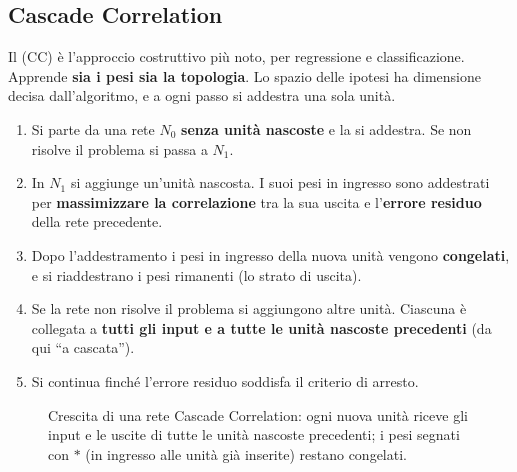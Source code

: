\subsection{Cascade Correlation}

Il  (CC) è l'approccio costruttivo più noto, per regressione e classificazione.
Apprende \textbf{sia i pesi sia la topologia}. Lo spazio delle ipotesi ha dimensione decisa dall'algoritmo, e a
ogni passo si addestra una sola unità.

\begin{algoritmo}
\begin{enumerate}
  \item Si parte da una rete $N_0$ \textbf{senza unità nascoste} e la si addestra. Se non risolve il problema si
        passa a $N_1$.
  \item In $N_1$ si aggiunge un'unità nascosta. I suoi pesi in ingresso sono addestrati per \textbf{massimizzare
        la correlazione} tra la sua uscita e l'\textbf{errore residuo} della rete precedente.
  \item Dopo l'addestramento i pesi in ingresso della nuova unità vengono \textbf{congelati}, e si riaddestrano i
        pesi rimanenti (lo strato di uscita).
  \item Se la rete non risolve il problema si aggiungono altre unità. Ciascuna è collegata a \textbf{tutti gli
        input e a tutte le unità nascoste precedenti} (da qui ``a cascata'').
  \item Si continua finché l'errore residuo soddisfa il criterio di arresto.
\end{enumerate}
\end{algoritmo}

\begin{figure}[ht]
\centering
{}
\caption{Crescita di una rete Cascade Correlation: ogni nuova unità riceve gli input e le uscite di tutte le unità
nascoste precedenti; i pesi segnati con $*$ (in ingresso alle unità già inserite) restano congelati.}
\label{fig:cascade}
\end{figure}

